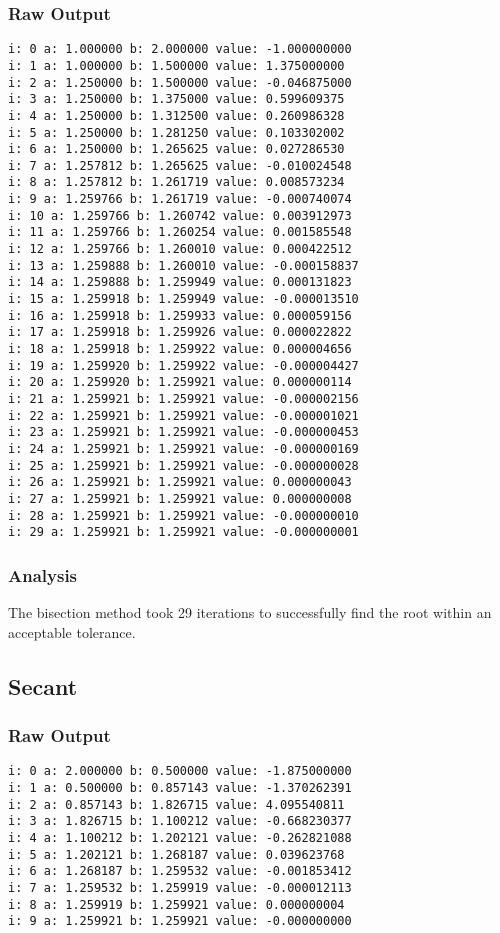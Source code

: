 \documentclass[11pt]{article} %
\begin{document}
\subsubsection*{Raw Output}
\begin{verbatim}
i: 0 a: 1.000000 b: 2.000000 value: -1.000000000 
i: 1 a: 1.000000 b: 1.500000 value: 1.375000000 
i: 2 a: 1.250000 b: 1.500000 value: -0.046875000 
i: 3 a: 1.250000 b: 1.375000 value: 0.599609375 
i: 4 a: 1.250000 b: 1.312500 value: 0.260986328 
i: 5 a: 1.250000 b: 1.281250 value: 0.103302002 
i: 6 a: 1.250000 b: 1.265625 value: 0.027286530 
i: 7 a: 1.257812 b: 1.265625 value: -0.010024548 
i: 8 a: 1.257812 b: 1.261719 value: 0.008573234 
i: 9 a: 1.259766 b: 1.261719 value: -0.000740074 
i: 10 a: 1.259766 b: 1.260742 value: 0.003912973 
i: 11 a: 1.259766 b: 1.260254 value: 0.001585548 
i: 12 a: 1.259766 b: 1.260010 value: 0.000422512 
i: 13 a: 1.259888 b: 1.260010 value: -0.000158837 
i: 14 a: 1.259888 b: 1.259949 value: 0.000131823 
i: 15 a: 1.259918 b: 1.259949 value: -0.000013510 
i: 16 a: 1.259918 b: 1.259933 value: 0.000059156 
i: 17 a: 1.259918 b: 1.259926 value: 0.000022822 
i: 18 a: 1.259918 b: 1.259922 value: 0.000004656 
i: 19 a: 1.259920 b: 1.259922 value: -0.000004427 
i: 20 a: 1.259920 b: 1.259921 value: 0.000000114 
i: 21 a: 1.259921 b: 1.259921 value: -0.000002156 
i: 22 a: 1.259921 b: 1.259921 value: -0.000001021 
i: 23 a: 1.259921 b: 1.259921 value: -0.000000453 
i: 24 a: 1.259921 b: 1.259921 value: -0.000000169 
i: 25 a: 1.259921 b: 1.259921 value: -0.000000028 
i: 26 a: 1.259921 b: 1.259921 value: 0.000000043 
i: 27 a: 1.259921 b: 1.259921 value: 0.000000008 
i: 28 a: 1.259921 b: 1.259921 value: -0.000000010 
i: 29 a: 1.259921 b: 1.259921 value: -0.000000001 
\end{verbatim}

\subsubsection*{Analysis}
The bisection method took 29 iterations to successfully find the root within an acceptable tolerance.
\subsection*{Secant}
\subsubsection*{Raw Output}
\begin{verbatim}
i: 0 a: 2.000000 b: 0.500000 value: -1.875000000 
i: 1 a: 0.500000 b: 0.857143 value: -1.370262391 
i: 2 a: 0.857143 b: 1.826715 value: 4.095540811 
i: 3 a: 1.826715 b: 1.100212 value: -0.668230377 
i: 4 a: 1.100212 b: 1.202121 value: -0.262821088 
i: 5 a: 1.202121 b: 1.268187 value: 0.039623768 
i: 6 a: 1.268187 b: 1.259532 value: -0.001853412 
i: 7 a: 1.259532 b: 1.259919 value: -0.000012113 
i: 8 a: 1.259919 b: 1.259921 value: 0.000000004 
i: 9 a: 1.259921 b: 1.259921 value: -0.000000000 
\end{verbatim}
\end{document}
